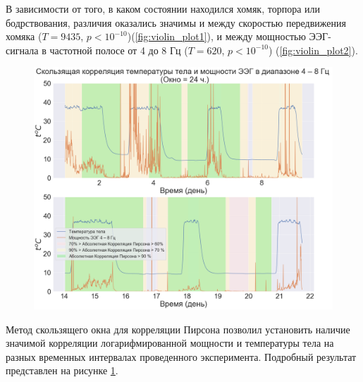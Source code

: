 \documentclass[12pt,a4paper,oneside]{article}
\begin{document}
В зависимости от того, в каком состоянии находился хомяк, торпора или бодрствования, различия оказались значимы и между скоростью передвижения хомяка ($T = 9435$, $p < 10^{-10}$)(\ref{fig:violin_plot1}), и между мощностью ЭЭГ-сигнала в частотной полосе от 4 до 8 Гц ($T = 620$, $p < 10^{-10}$) (\ref{fig:violin_plot2}). 

\begin{figure}[H]
\centering
\includegraphics[width=0.7\linewidth]{moving_correlation.png}
\caption{}\label{fig:moving_correlation}
\end{figure}

Метод скользящего окна для корреляции Пирсона позволил установить наличие значимой корреляции логарифмированной мощности и температуры тела на разных временных интервалах проведенного эксперимента. Подробный результат представлен на рисунке \ref{fig:moving_correlation}.





\end{document}
